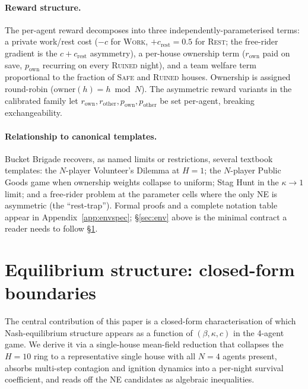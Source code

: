 \documentclass{anvil-paper}
\begin{document}
\paragraph{Reward structure.}
The per-agent reward decomposes into three independently-parameterised terms:
a private work/rest cost ($-c$ for \textsc{Work}, $+c_{\text{rest}}{=}0.5$
for \textsc{Rest}; the free-rider gradient is the $c{+}c_{\text{rest}}$
asymmetry), a per-house ownership term ($r_{\text{own}}$ paid on save,
$p_{\text{own}}$ recurring on every \textsc{Ruined} night), and a team
welfare term proportional to the fraction of \textsc{Safe} and
\textsc{Ruined} houses. Ownership is assigned round-robin
($\text{owner}(h){=}h\bmod N$). The asymmetric reward variants in the
calibrated family let $r_{\text{own}},r_{\text{other}},p_{\text{own}},
p_{\text{other}}$ be set per-agent, breaking exchangeability.

\paragraph{Relationship to canonical templates.}
Bucket Brigade recovers, as named limits or restrictions, several textbook
templates: the $N$-player Volunteer's Dilemma at $H{=}1$; the $N$-player
Public Goods game when ownership weights collapse to uniform; Stag Hunt in
the $\kappa{\to}1$ limit; and a free-rider problem at the parameter cells
where the only NE is asymmetric (the ``rest-trap''). Formal proofs and a
complete notation table appear in Appendix~\ref{app:envspec};
\S\ref{sec:env} above is the minimal contract a reader needs to follow
\S\ref{sec:ne}.

\section{Equilibrium structure: closed-form boundaries}
\label{sec:ne}

The central contribution of this paper is a closed-form characterisation of
which Nash-equilibrium structure appears as a function of $(\beta,\kappa,c)$
in the 4-agent game. We derive it via a single-house mean-field reduction
that collapses the $H{=}10$ ring to a representative single house with all
$N{=}4$ agents present, absorbs multi-step contagion and ignition dynamics
into a per-night survival coefficient, and reads off the NE candidates as
algebraic inequalities.
\end{document}
